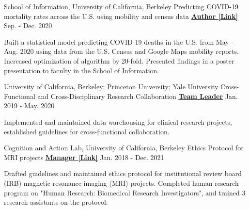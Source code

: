\begin{cventries}

 \cventry
   {School of Information, University of California, Berkeley} %
   {Predicting COVID-19 mortality rates across the U.S. using mobility and census data} %
    {\href{https://drive.google.com/file/d/1l9TLGLmstkJsvOJQPxHe_f35b4fEkDU4/view}{\textbf{Author [Link]}}}
    {Sep. - Dec. 2020}
    {
      \begin{cvitems} %
      	\item {Built a statistical model predicting COVID-19 deaths in the U.S. from May - Aug. 2020 using data from the U.S. Census and Google Maps mobility reports. Increased optimization of algorithm by 20-fold. Presented findings in a poster presentation to faculty in the School of Information.}
      \end{cvitems}
    }
    
  \cventry 
    {University of California, Berkeley; Princeton University; Yale University} %
    {Cross-Functional and Cross-Disciplinary Research Collaboration}
    {\href{http://www.actcompthink.org/pubs/McDougleTsayEtAl_2021.pdf}{\textbf{Team Leader}}} %
    {Jan. 2019 - May. 2020} %
    {
      \begin{cvitems} %
      	\item {Implemented and maintained data warehousing for clinical research projects, established guidelines for cross-functional collaboration.}
      \end{cvitems}
    } 

  \cventry 
    {Cognition and Action Lab, University of California, Berkeley} %
    {Ethics Protocol for MRI projects}
    {\href{https://drive.google.com/file/d/1h66emU7-TRl-mSLZTEH01E3Qf5ZpEdbv/view?usp=sharing}{\textbf{Manager [Link]}}} %
    {Jan. 2018 - Dec. 2021} %
    {
      \begin{cvitems} %
      	\item {Drafted guidelines and maintained ethics protocol for institutional review board (IRB) magnetic resonance imaging (MRI) projects. Completed human research program on "Human Research: Biomedical Research Investigators", and trained 3 research assistants on the protocol.}
      \end{cvitems}
    }
 
\end{cventries}